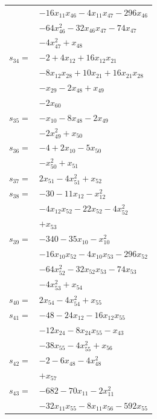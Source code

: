 \begin{longtable}{@{}r@{\;}l@{}}
 & \(\displaystyle -16x_{11}x_{46} -4x_{11}x_{47} -296x_{46}\) \\
 & \(\displaystyle -64x_{46}^{2} -32x_{46}x_{47} -74x_{47}\) \\
 & \(\displaystyle -4x_{47}^{2} +x_{48}\) \\[3pt]
\(s_{34}=\) & \(\displaystyle -2 +4x_{12} +16x_{12}x_{21}\) \\
 & \(\displaystyle -8x_{12}x_{28} +10x_{21} +16x_{21}x_{28}\) \\
 & \(\displaystyle -x_{29} -2x_{48} +x_{49}\) \\
 & \(\displaystyle -2x_{60}\) \\[3pt]
\(s_{35}=\) & \(\displaystyle -x_{10} -8x_{48} -2x_{49}\) \\
 & \(\displaystyle -2x_{49}^{2} +x_{50}\) \\[3pt]
\(s_{36}=\) & \(\displaystyle -4 +2x_{10} -5x_{50}\) \\
 & \(\displaystyle -x_{50}^{2} +x_{51}\) \\[3pt]
\(s_{37}=\) & \(\displaystyle 2x_{51} -4x_{51}^{2} +x_{52}\) \\[3pt]
\(s_{38}=\) & \(\displaystyle -30 -11x_{12} -x_{12}^{2}\) \\
 & \(\displaystyle -4x_{12}x_{52} -22x_{52} -4x_{52}^{2}\) \\
 & \(\displaystyle +x_{53}\) \\[3pt]
\(s_{39}=\) & \(\displaystyle -340 -35x_{10} -x_{10}^{2}\) \\
 & \(\displaystyle -16x_{10}x_{52} -4x_{10}x_{53} -296x_{52}\) \\
 & \(\displaystyle -64x_{52}^{2} -32x_{52}x_{53} -74x_{53}\) \\
 & \(\displaystyle -4x_{53}^{2} +x_{54}\) \\[3pt]
\(s_{40}=\) & \(\displaystyle 2x_{54} -4x_{54}^{2} +x_{55}\) \\[3pt]
\(s_{41}=\) & \(\displaystyle -48 -24x_{12} -16x_{12}x_{55}\) \\
 & \(\displaystyle -12x_{24} -8x_{24}x_{55} -x_{43}\) \\
 & \(\displaystyle -38x_{55} -4x_{55}^{2} +x_{56}\) \\[3pt]
\(s_{42}=\) & \(\displaystyle -2 -6x_{48} -4x_{48}^{2}\) \\
 & \(\displaystyle +x_{57}\) \\[3pt]
\(s_{43}=\) & \(\displaystyle -682 -70x_{11} -2x_{11}^{2}\) \\
 & \(\displaystyle -32x_{11}x_{55} -8x_{11}x_{56} -592x_{55}\) \\

\end{longtable}
